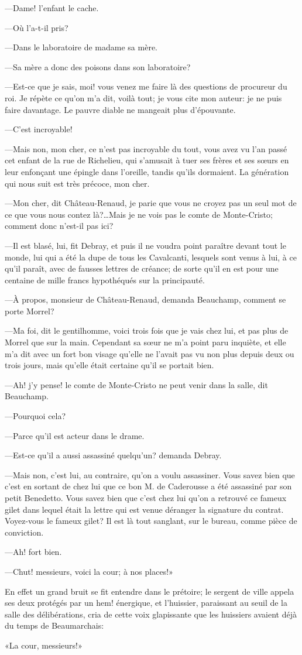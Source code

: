 —Dame! l'enfant le cache. 

—Où l'a-t-il pris? 

—Dans le laboratoire de madame sa mère. 

—Sa mère a donc des poisons dans son laboratoire? 

—Est-ce que je sais, moi! vous venez me faire là des questions de procureur du roi. Je répète ce qu'on m'a dit, voilà tout; je vous cite mon auteur: je ne puis faire davantage. Le pauvre diable ne mangeait plus d'épouvante. 

—C'est incroyable! 

—Mais non, mon cher, ce n'est pas incroyable du tout, vous avez vu l'an passé cet enfant de la rue de Richelieu, qui s'amusait à tuer ses frères et ses sœurs en leur enfonçant une épingle dans l'oreille, tandis qu'ils dormaient. La génération qui nous suit est très précoce, mon cher. 

—Mon cher, dit Château-Renaud, je parie que vous ne croyez pas un seul mot de ce que vous nous contez là?\dots Mais je ne vois pas le comte de Monte-Cristo; comment donc n'est-il pas ici? 

—Il est blasé, lui, fit Debray, et puis il ne voudra point paraître devant tout le monde, lui qui a été la dupe de tous les Cavalcanti, lesquels sont venus à lui, à ce qu'il paraît, avec de fausses lettres de créance; de sorte qu'il en est pour une centaine de mille francs hypothéqués sur la principauté. 

—À propos, monsieur de Château-Renaud, demanda Beauchamp, comment se porte Morrel? 

—Ma foi, dit le gentilhomme, voici trois fois que je vais chez lui, et pas plus de Morrel que sur la main. Cependant sa sœur ne m'a point paru inquiète, et elle m'a dit avec un fort bon visage qu'elle ne l'avait pas vu non plus depuis deux ou trois jours, mais qu'elle était certaine qu'il se portait bien. 

—Ah! j'y pense! le comte de Monte-Cristo ne peut venir dans la salle, dit Beauchamp. 

—Pourquoi cela? 

—Parce qu'il est acteur dans le drame. 

—Est-ce qu'il a aussi assassiné quelqu'un? demanda Debray. 

—Mais non, c'est lui, au contraire, qu'on a voulu assassiner. Vous savez bien que c'est en sortant de chez lui que ce bon M. de Caderousse a été assassiné par son petit Benedetto. Vous savez bien que c'est chez lui qu'on a retrouvé ce fameux gilet dans lequel était la lettre qui est venue déranger la signature du contrat. Voyez-vous le fameux gilet? Il est là tout sanglant, sur le bureau, comme pièce de conviction. 

—Ah! fort bien. 

—Chut! messieurs, voici la cour; à nos places!» 

En effet un grand bruit se fit entendre dans le prétoire; le sergent de ville appela ses deux protégés par un hem! énergique, et l'huissier, paraissant au seuil de la salle des délibérations, cria de cette voix glapissante que les huissiers avaient déjà du temps de Beaumarchais: 

«La cour, messieurs!» 